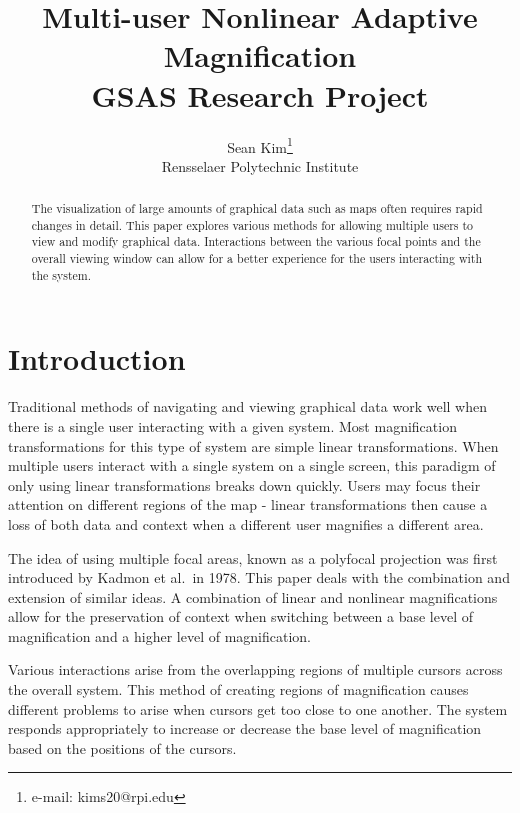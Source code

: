 \documentclass[annual]{acmsiggraph}
\title{Multi-user Nonlinear Adaptive Magnification\\ 
\textnormal{GSAS Research Project}}
\author{Sean Kim\thanks{e-mail: kims20@rpi.edu}\\Rensselaer
Polytechnic Institute}
\begin{document}
\maketitle

\begin{abstract}

The visualization of large amounts of graphical data such as maps often requires 
rapid changes in detail. This paper explores various methods for allowing multiple
users to view and modify graphical data. Interactions between the various focal
points and the overall viewing window can allow for a better experience for the users
interacting with the system. 

\end{abstract}

\keywordlist



\section{Introduction}
Traditional methods of navigating and viewing graphical data work well when
there is a single user interacting with a given system. Most magnification
transformations for this type of system are simple linear transformations.
When multiple users interact with a single system on a single screen, this
paradigm of only using linear transformations breaks down quickly. Users 
may focus their attention on different regions of the map - linear 
transformations then cause a loss of both data and context when a different
user magnifies a different area. 

The idea of using multiple focal areas, known as a polyfocal projection was
first introduced by Kadmon et al.\ in 1978. This paper deals with the
combination and extension of similar ideas. A combination of linear and
nonlinear magnifications allow for the preservation of context when switching
between a base level of magnification and a higher level of magnification. 

Various interactions arise from the overlapping regions of multiple cursors
across the overall system. This method of creating regions of magnification
causes different problems to arise when cursors get too close to one another.
The system responds appropriately to increase or decrease the base level of 
magnification based on the positions of the cursors. 
\end{document}
